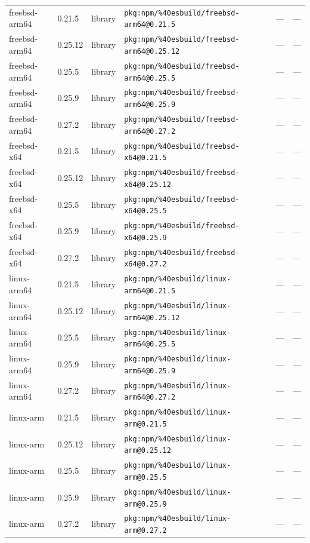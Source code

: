 \documentclass[11pt]{article}
\begin{document}
\begin{longtable}{|l|l|l|p{2.2cm}|l|p{4cm}|}
freebsd-arm64 & 0.21.5 & library & \texttt{pkg:npm/\%40esbuild/freebsd-arm64@0.21.5} & — & — \\
freebsd-arm64 & 0.25.12 & library & \texttt{pkg:npm/\%40esbuild/freebsd-arm64@0.25.12} & — & — \\
freebsd-arm64 & 0.25.5 & library & \texttt{pkg:npm/\%40esbuild/freebsd-arm64@0.25.5} & — & — \\
freebsd-arm64 & 0.25.9 & library & \texttt{pkg:npm/\%40esbuild/freebsd-arm64@0.25.9} & — & — \\
freebsd-arm64 & 0.27.2 & library & \texttt{pkg:npm/\%40esbuild/freebsd-arm64@0.27.2} & — & — \\
freebsd-x64 & 0.21.5 & library & \texttt{pkg:npm/\%40esbuild/freebsd-x64@0.21.5} & — & — \\
freebsd-x64 & 0.25.12 & library & \texttt{pkg:npm/\%40esbuild/freebsd-x64@0.25.12} & — & — \\
freebsd-x64 & 0.25.5 & library & \texttt{pkg:npm/\%40esbuild/freebsd-x64@0.25.5} & — & — \\
freebsd-x64 & 0.25.9 & library & \texttt{pkg:npm/\%40esbuild/freebsd-x64@0.25.9} & — & — \\
freebsd-x64 & 0.27.2 & library & \texttt{pkg:npm/\%40esbuild/freebsd-x64@0.27.2} & — & — \\
linux-arm64 & 0.21.5 & library & \texttt{pkg:npm/\%40esbuild/linux-arm64@0.21.5} & — & — \\
linux-arm64 & 0.25.12 & library & \texttt{pkg:npm/\%40esbuild/linux-arm64@0.25.12} & — & — \\
linux-arm64 & 0.25.5 & library & \texttt{pkg:npm/\%40esbuild/linux-arm64@0.25.5} & — & — \\
linux-arm64 & 0.25.9 & library & \texttt{pkg:npm/\%40esbuild/linux-arm64@0.25.9} & — & — \\
linux-arm64 & 0.27.2 & library & \texttt{pkg:npm/\%40esbuild/linux-arm64@0.27.2} & — & — \\
linux-arm & 0.21.5 & library & \texttt{pkg:npm/\%40esbuild/linux-arm@0.21.5} & — & — \\
linux-arm & 0.25.12 & library & \texttt{pkg:npm/\%40esbuild/linux-arm@0.25.12} & — & — \\
linux-arm & 0.25.5 & library & \texttt{pkg:npm/\%40esbuild/linux-arm@0.25.5} & — & — \\
linux-arm & 0.25.9 & library & \texttt{pkg:npm/\%40esbuild/linux-arm@0.25.9} & — & — \\
linux-arm & 0.27.2 & library & \texttt{pkg:npm/\%40esbuild/linux-arm@0.27.2} & — & — \\

\end{longtable}
\end{document}
